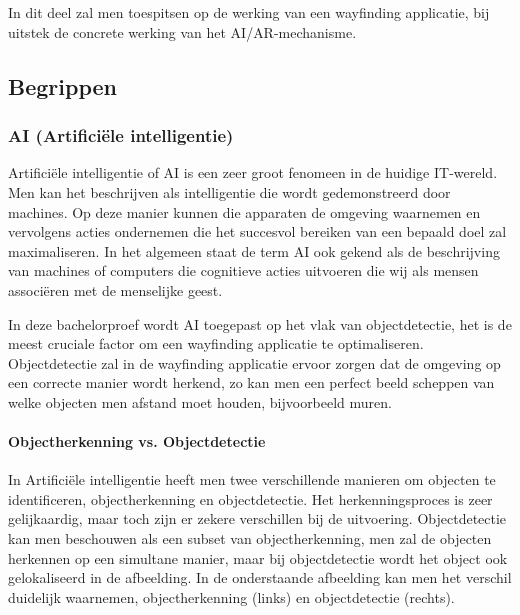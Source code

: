 \chapter{}
\label{ch:stand-van-zaken}




In dit deel zal men toespitsen op de werking van een wayfinding applicatie, bij uitstek de concrete werking van het AI/AR-mechanisme.

\section{Begrippen}
\subsection{AI (Artificiële intelligentie)}
Artificiële intelligentie of AI is een zeer groot fenomeen in de huidige IT-wereld. Men kan het beschrijven als intelligentie die wordt gedemonstreerd door machines. Op deze manier kunnen die apparaten de omgeving waarnemen en vervolgens acties ondernemen die het succesvol bereiken van een bepaald doel zal maximaliseren. In het algemeen staat de term AI ook gekend als de beschrijving van machines of computers die cognitieve acties uitvoeren die wij als mensen associëren met de menselijke geest.

In deze bachelorproef wordt AI toegepast op het vlak van objectdetectie, het is de meest cruciale factor om een wayfinding applicatie te optimaliseren.
Objectdetectie zal in de wayfinding applicatie ervoor zorgen dat de omgeving op een correcte manier wordt herkend, zo kan men een perfect beeld scheppen van welke objecten men afstand moet houden, bijvoorbeeld muren.

\subsubsection{Objectherkenning vs. Objectdetectie}
In Artificiële intelligentie heeft men twee verschillende manieren om objecten te identificeren, objectherkenning en objectdetectie. Het herkenningsproces is zeer gelijkaardig, maar toch zijn er zekere verschillen bij de uitvoering. Objectdetectie kan men beschouwen als een subset van objectherkenning, men zal de objecten herkennen op een simultane manier, maar bij objectdetectie wordt het object ook gelokaliseerd in de afbeelding. In de onderstaande afbeelding kan men het verschil duidelijk waarnemen, objectherkenning (links) en objectdetectie (rechts). \autocite{ObjRec2020}

